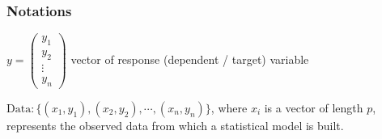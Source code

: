 \documentclass[compress]{beamer}
\begin{document}
%	
%
%	


\begin{frame}
	\frametitle{Notations}
	
	
	
	
	
	
	$y = \left(
	\begin{matrix}
		y_1  \\
		y_2  \\
		\vdots  \\
		y_n 
	\end{matrix} 
	\right)$  
	\small{vector of response (dependent / target) variable}
	
	\hspace{0.5cm}
	
	${\text{Data}}: \{(x_1, y_1), (x_2, y_2), \cdots, (x_n, y_n) \}$, where $x_i$ is a vector of 
	length $p$, represents the observed data from which 
	a statistical model is built. 			
\end{frame}
\end{document}
